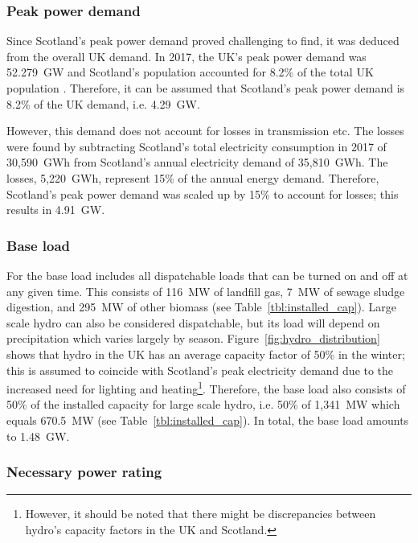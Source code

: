 \subsubsection{Peak power demand}

Since Scotland's peak power demand proved challenging to find, it was deduced from the overall UK demand.
In 2017, the UK's peak power demand was 52.279~GW \citep{BEIS2018PeakDemand} and Scotland's population accounted for 8.2\% of the total UK population \citep{OfficeforNationalStatistics2018}.
Therefore, it can be assumed that Scotland's peak power demand is 8.2\% of the UK demand, i.e. 4.29~GW.

However, this demand does not account for losses in transmission etc.
The losses were found by subtracting Scotland's total electricity consumption in 2017 of 30,590~GWh \citep{BEIS2018ElecUK} from Scotland's annual electricity demand of 35,810~GWh.
The losses, 5,220~GWh, represent 15\% of the annual energy demand.
Therefore, Scotland's peak power demand was scaled up by 15\% to account for losses; this results in 4.91~GW.



\subsubsection{Base load}

For the base load includes all dispatchable loads that can be turned on and off at any given time.
This consists of 116~MW of landfill gas, 7~MW of sewage sludge digestion, and 295~MW of other biomass (see Table~\ref{tbl:installed_cap}).
Large scale hydro can also be considered dispatchable, but its load will depend on precipitation which varies largely by season.
Figure~\ref{fig:hydro_distribution} shows that hydro in the UK has an average capacity factor of 50\% in the winter; this is assumed to coincide with Scotland's peak electricity demand due to the increased need for lighting and heating\footnote{However, it should be noted that there might be discrepancies between hydro's capacity factors in the UK and Scotland.}.
Therefore, the base load also consists of 50\% of the installed capacity for large scale hydro, i.e. 50\% of 1,341~MW which equals 670.5~MW (see Table~\ref{tbl:installed_cap}).
In total, the base load amounts to 1.48~GW.




\subsubsection{Necessary power rating}

